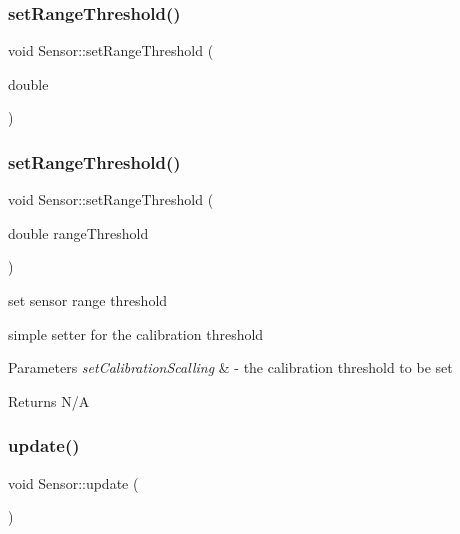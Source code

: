 \subsubsection{\texorpdfstring{set\+Range\+Threshold()}{setRangeThreshold()}\hspace{0.1cm}{\footnotesize\ttfamily [1/2]}}
{\footnotesize\ttfamily void Sensor\+::set\+Range\+Threshold (\begin{DoxyParamCaption}\item[{double}]{ }\end{DoxyParamCaption})}

\mbox{\label{class_sensor_a1ed79291c81c8e11cdb369fd895c42cc}} 
\subsubsection{\texorpdfstring{set\+Range\+Threshold()}{setRangeThreshold()}\hspace{0.1cm}{\footnotesize\ttfamily [2/2]}}
{\footnotesize\ttfamily void Sensor\+::set\+Range\+Threshold (\begin{DoxyParamCaption}\item[{double}]{range\+Threshold }\end{DoxyParamCaption})}



set sensor range threshold 

simple setter for the calibration threshold


\begin{DoxyParams}{Parameters}
{\em set\+Calibration\+Scalling} & -\/ the calibration threshold to be set \\
\hline
\end{DoxyParams}
\begin{DoxyReturn}{Returns}
N/A 
\end{DoxyReturn}
\mbox{\label{class_sensor_a542a721041768395de2c6e9012622113}} 
\subsubsection{\texorpdfstring{update()}{update()}\hspace{0.1cm}{\footnotesize\ttfamily [1/2]}}
{\footnotesize\ttfamily void Sensor\+::update (\begin{DoxyParamCaption}{ }\end{DoxyParamCaption})\hspace{0.3cm}{\ttfamily [private]}}

